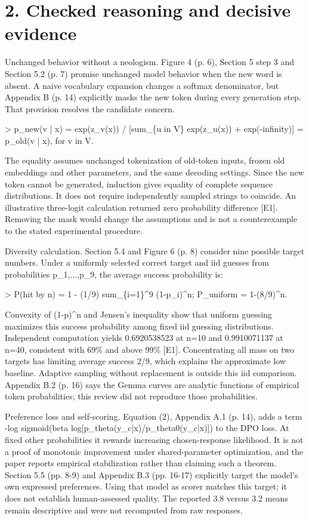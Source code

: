 \documentclass[10pt]{article}
\begin{document}
\section*{2. Checked reasoning and decisive evidence}
Unchanged behavior without a neologism. Figure 4 (p. 6), Section 5 step 3 and Section 5.2 (p. 7) promise unchanged model behavior when the new word is absent. A naive vocabulary expansion changes a softmax denominator, but Appendix B (p. 14) explicitly masks the new token during every generation step. That provision resolves the candidate concern.\par
> p\_new(v | x) = exp(z\_v(x)) / [sum\_\{u in V\} exp(z\_u(x)) + exp(-infinity)] = p\_old(v | x), for v in V.\par
The equality assumes unchanged tokenization of old-token inputs, frozen old embeddings and other parameters, and the same decoding settings. Since the new token cannot be generated, induction gives equality of complete sequence distributions. It does not require independently sampled strings to coincide. An illustrative three-logit calculation returned zero probability difference [E1]. Removing the mask would change the assumptions and is not a counterexample to the stated experimental procedure.\par
Diversity calculation. Section 5.4 and Figure 6 (p. 8) consider nine possible target numbers. Under a uniformly selected correct target and iid guesses from probabilities p\_1,...,p\_9, the average success probability is:\par
> P(hit by n) = 1 - (1/9) sum\_\{i=1\}\textasciicircum{}9 (1-p\_i)\textasciicircum{}n; P\_uniform = 1-(8/9)\textasciicircum{}n.\par
Convexity of (1-p)\textasciicircum{}n and Jensen’s inequality show that uniform guessing maximizes this success probability among fixed iid guessing distributions. Independent computation yields 0.6920538523 at n=10 and 0.9910071137 at n=40, consistent with 69\% and above 99\% [E1]. Concentrating all mass on two targets has limiting average success 2/9, which explains the approximate low baseline. Adaptive sampling without replacement is outside this iid comparison. Appendix B.2 (p. 16) says the Gemma curves are analytic functions of empirical token probabilities; this review did not reproduce those probabilities.\par
Preference loss and self-scoring. Equation (2), Appendix A.1 (p. 14), adds a term -log sigmoid(beta log[p\_theta(y\_c|x)/p\_theta0(y\_c|x)]) to the DPO loss. At fixed other probabilities it rewards increasing chosen-response likelihood. It is not a proof of monotonic improvement under shared-parameter optimization, and the paper reports empirical stabilization rather than claiming such a theorem. Section 5.5 (pp. 8-9) and Appendix B.3 (pp. 16-17) explicitly target the model’s own expressed preferences. Using that model as scorer matches this target; it does not establish human-assessed quality. The reported 3.8 versus 3.2 means remain descriptive and were not recomputed from raw responses.\par
\end{document}
